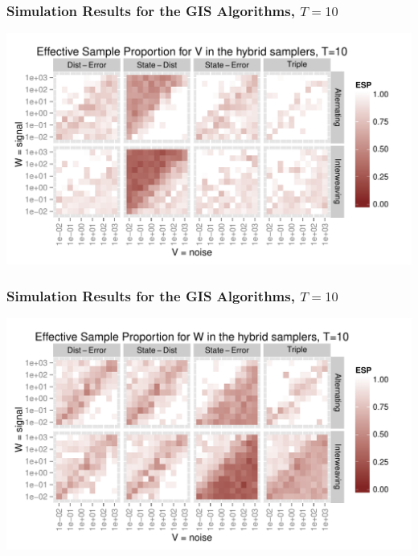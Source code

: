 \documentclass[xcolor=dvipsnames]{beamer}\usepackage{graphicx, color}
\newenvironment{knitrout}{}{} %
\begin{document}
\begin{frame}
    \frametitle{Simulation Results for the GIS Algorithms, $T=10$}
    
\begin{knitrout}\footnotesize
{}\color{fgcolor}
\includegraphics[width=1\textwidth]{figure/altintESplotT10-1} 

\end{knitrout}


\end{frame}

\begin{frame}
    \frametitle{Simulation Results for the GIS Algorithms, $T=10$}
    
\begin{knitrout}\footnotesize
{}\color{fgcolor}
\includegraphics[width=1\textwidth]{figure/altintESplotT10-2} 

\end{knitrout}

\end{frame}
\end{document}
